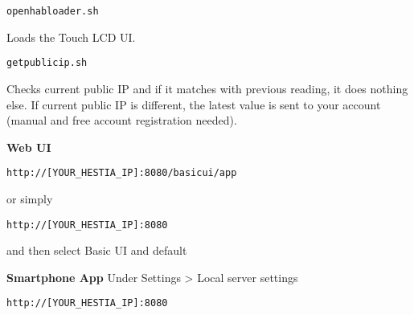\texttt{openhabloader.sh }

Loads the Touch LCD UI.

\texttt{getpublicip.sh }

Checks current public IP and if it matches with previous reading, it does
nothing else. If current public IP is different, the latest value is sent to
your account (manual and free account registration needed).
    
\textbf{Web UI}

\texttt{http://[YOUR\_HESTIA\_IP]:8080/basicui/app}

or simply


\texttt{http://[YOUR\_HESTIA\_IP]:8080}

and then select Basic UI and default

\textbf{Smartphone App}
Under Settings > Local server settings


\texttt{http://[YOUR\_HESTIA\_IP]:8080}
